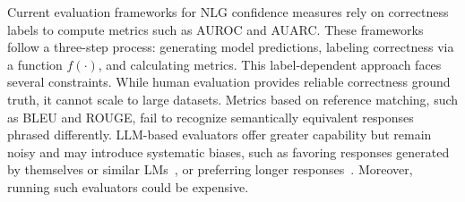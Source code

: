 
Current evaluation frameworks for NLG confidence measures rely on correctness labels to compute metrics such as AUROC and AUARC. 
These frameworks follow a three-step process: generating model predictions, labeling correctness via a function $f(\cdot)$, and calculating metrics. 
This label-dependent approach faces several constraints. While human evaluation provides reliable correctness ground truth, it cannot scale to large datasets. 
Metrics based on reference matching, such as BLEU and ROUGE, fail to recognize semantically equivalent responses phrased differently.
LLM-based evaluators offer greater capability but remain noisy and may introduce systematic biases, such as favoring responses generated by themselves or similar LMs~\cite{panickssery2024llm}, or preferring longer responses~\cite{lin2022truthfulqa}.
Moreover, running such evaluators could be expensive.


